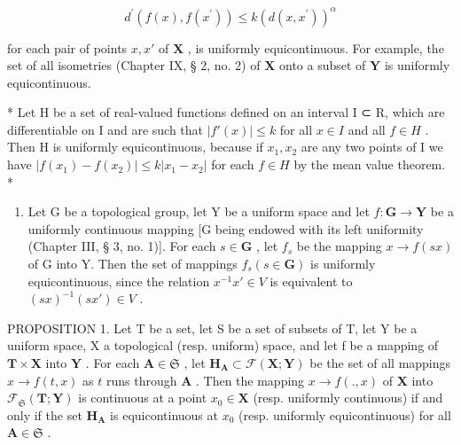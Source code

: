 \[
d ^ {\prime} (f (x), f (x ^ {\prime})) \leqslant k (d (x, x ^ {\prime})) ^ {\alpha}
\]

for each pair of points \(x, x'\) of \(\mathbf{X}\) , is uniformly equicontinuous. For example, the set of all isometries (Chapter IX, § 2, no. 2) of \(\mathbf{X}\) onto a subset of \(\mathbf{Y}\) is uniformly equicontinuous.

* Let H be a set of real-valued functions defined on an interval I ⊂ R, which are differentiable on I and are such that \(|f'(x)| \leqslant k\) for all \(x \in I\) and all \(f \in H\) . Then H is uniformly equicontinuous, because if \(x_{1}, x_{2}\) are any two points of I we have \(|f(x_{1}) - f(x_{2})| \leqslant k |x_{1} - x_{2}|\) for each \(f \in H\) by the mean value theorem. *

\begin{enumerate}
\def\labelenumi{\arabic{enumi})}
\setcounter{enumi}{2}
\tightlist
\item
  Let G be a topological group, let Y be a uniform space and let \(f: \mathbf{G} \to \mathbf{Y}\) be a uniformly continuous mapping {[}G being endowed with its left uniformity (Chapter III, § 3, no. 1){]}. For each \(s \in \mathbf{G}\) , let \(f_s\) be the mapping \(x \to f(sx)\) of G into Y. Then the set of mappings \(f_s(s \in \mathbf{G})\) is uniformly equicontinuous, since the relation \(x^{-1}x' \in V\) is equivalent to \((sx)^{-1}(sx') \in V\) .
\end{enumerate}

PROPOSITION 1. Let T be a set, let S be a set of subsets of T, let Y be a uniform space, X a topological (resp. uniform) space, and let f be a mapping of \(\mathbf{T} \times \mathbf{X}\) into \(\mathbf{Y}\) . For each \(\mathbf{A} \in \mathfrak{S}\) , let \(\mathbf{H}_{\mathbf{A}} \subset \mathcal{F}(\mathbf{X}; \mathbf{Y})\) be the set of all mappings \(x \to f(t, x)\) as \(t\) runs through \(\mathbf{A}\) . Then the mapping \(x \to f(., x)\) of \(\mathbf{X}\) into \(\mathcal{F}_{\mathfrak{S}}(\mathbf{T}; \mathbf{Y})\) is continuous at a point \(x_0 \in \mathbf{X}\) (resp. uniformly continuous) if and only if the set \(\mathbf{H}_{\mathbf{A}}\) is equicontinuous at \(x_0\) (resp. uniformly equicontinuous) for all \(\mathbf{A} \in \mathfrak{S}\) .

